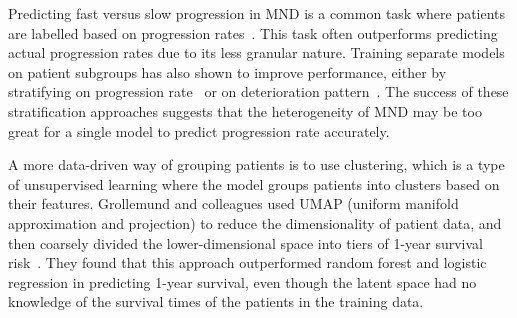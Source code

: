 

Predicting fast versus slow progression in MND is a common task where patients are labelled based on progression rates~\cite{ongPredictingFunctionalDecline2017, dinabduljabbarPredictingAmyotrophicLateral2023}.
This task often outperforms predicting actual progression rates due to its less granular nature.
Training separate models on patient subgroups has also shown to improve performance, either by stratifying on progression rate~\cite{piresPredictingNoninvasiveVentilation2018} or on deterioration pattern~\cite{halbersbergTemporalModelingDeterioration2019}.
The success of these stratification approaches suggests that the heterogeneity of MND may be too great for a single model to predict progression rate accurately.

A more data-driven way of grouping patients is to use clustering, which is a type of unsupervised learning where the model groups patients into clusters based on their features.
Grollemund and colleagues used UMAP (uniform manifold approximation and projection) to reduce the dimensionality of patient data, and then coarsely divided the lower-dimensional space into tiers of 1-year survival risk~\cite{grollemundDevelopmentValidation1year2020}.
They found that this approach outperformed random forest and logistic regression in predicting 1-year survival, even though the latent space had no knowledge of the survival times of the patients in the training data.

